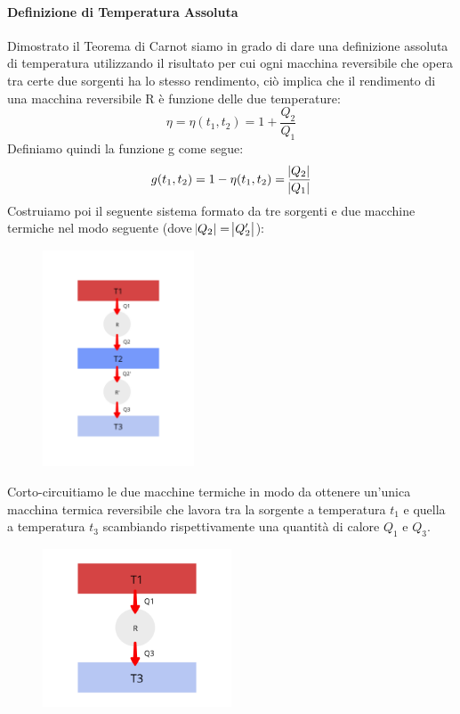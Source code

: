 \documentclass{article}
\begin{document}
\paragraph{Definizione di Temperatura Assoluta}
Dimostrato il Teorema di Carnot siamo in grado di dare una definizione assoluta di temperatura utilizzando il risultato per cui ogni macchina reversibile che opera tra certe due sorgenti ha lo stesso rendimento, ciò implica che il rendimento di una macchina reversibile R è funzione delle due temperature:
\[\eta=\eta(t_1,t_2)=1+\frac{Q_2}{Q_1}\]
Definiamo quindi la funzione g come segue:
\[g(t_1,t_2)=1-\eta(t_1,t_2)=\frac{\abs{Q_2}}{\abs{Q_1}}\]
Costruiamo poi il seguente sistema formato da tre sorgenti e due macchine termiche nel modo seguente (dove $\abs{Q_2}=\abs{Q_2'}$):
\begin{figure}[H]
    \centering
    \includegraphics[width=0.4\textwidth]{TemperaturaAssoluta.png}
    \label{TemperauraAssoluta}
\end{figure}
Corto-circuitiamo le due macchine termiche in modo da ottenere un'unica macchina termica reversibile che lavora tra la sorgente a temperatura $t_1$ e quella a temperatura $t_3$ scambiando rispettivamente una quantità di calore $Q_1$ e $Q_3$.
\begin{figure}[H]
    \centering
    \includegraphics[width=0.5\textwidth]{TempAss.png}
\end{figure}
\end{document}
